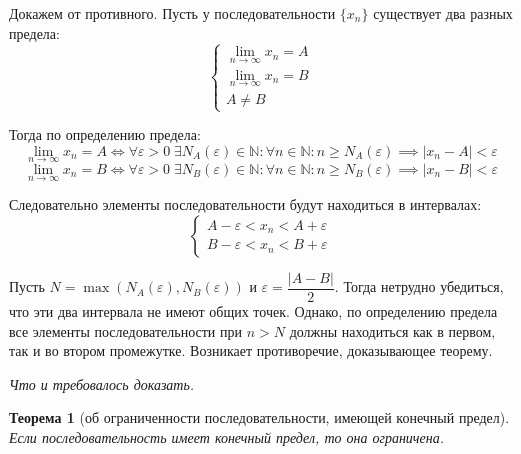\documentclass[a4paper,12pt,oneside]{extbook}
\newcommand{\newpar}{$ $\par\nobreak\ignorespaces}
\theoremstyle{numbered}
\theoremstyle{unnumbered}
\newtheorem*{theorem*}{Теорема}
\theoremstyle{named}
\theoremstyle{unnumbered}
\theoremstyle{named}
\theoremstyle{named}
\theoremstyle{named}
\renewenvironment{proof}[1][]{\breakenv[Доказательство]{\if\relax\detokenize{#1}\relax\else\;\fi}{\textbf{#1}}}{\smallskip\newpar \hfill\textit{Что и требовалось доказать.}}
\begin{document}
\begin{proof}
    Докажем от противного. Пусть у последовательности \(\{x_n\}\) существует два разных предела:
    \[
        \begin{cases}
            \displaystyle
            \lim_{n \to \infty}{x_n} = A \\
            \displaystyle
            \lim_{n \to \infty}{x_n} = B \\
            A \neq B
        \end{cases}
    \]

    Тогда по определению предела:
    \[
        \lim_{n \to \infty}{x_n} = A \iff
        \forall \varepsilon > 0 \; \exists N_{A}(\varepsilon) \in \mathbb{N}: \forall n \in \mathbb{N}: n \geq N_{A}(\varepsilon) \implies |x_n - A| < \varepsilon
    \]
    \[
        \lim_{n \to \infty}{x_n} = B \iff
        \forall \varepsilon > 0 \; \exists N_{B}(\varepsilon) \in \mathbb{N}: \forall n \in \mathbb{N}: n \geq N_{B}(\varepsilon) \implies |x_n - B| < \varepsilon
    \]

    Следовательно элементы последовательности будут находиться в интервалах:
    \[
        \begin{cases}
            A - \varepsilon < x_n < A + \varepsilon \\
            B - \varepsilon < x_n < B + \varepsilon
        \end{cases}
    \]

    Пусть \(N = \max(N_{A}(\varepsilon), N_{B}(\varepsilon))\) и \(\varepsilon = \dfrac{|A - B|}{2}\). Тогда нетрудно убедиться, что эти два интервала не имеют общих точек. Однако, по определению предела все элементы последовательности при \(n > N\) должны находиться как в первом, так и во втором промежутке. Возникает противоречие, доказывающее теорему.
\end{proof}

\begin{theorem*}[об ограниченности последовательности, имеющей конечный предел]
    Если последовательность имеет конечный предел, то она ограничена.
\end{theorem*}
\end{document}
